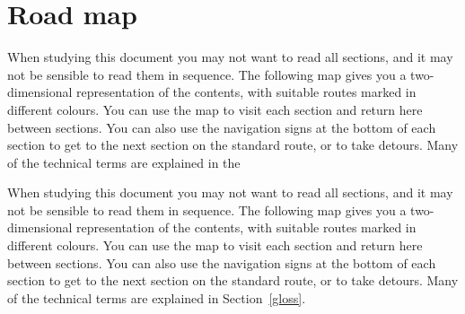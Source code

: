 \begin{htmlonly}
\end{htmlonly}

 \newpage
 \begin{latexonly}
   \setlength{\parskip}{0mm}
   \latexonlytoc
   \setlength{\parskip}{\medskipamount}
   \markright{\stardocname}
 \end{latexonly}
\newpage
\renewcommand{\thepage}{\arabic{page}}
\setcounter{page}{1}


\section{\label{roadmap}Road map}

\begin{htmlonly}
   When studying this document you may not want to read all sections,
   and it may not be sensible to read them in sequence. The following
   map gives you a two-dimensional representation of the contents, with
   suitable routes marked in different colours. You can use the map to
   visit each section and return here between sections. You can
   also use the navigation signs at the bottom of each section to
   get to the next section on the standard route, or to take detours.
   Many of the technical terms are explained in the
\end{htmlonly}
\begin{latexonly}
   When studying this document you may not want to read all sections,
   and it may not be sensible to read them in sequence. The following
   map gives you a two-dimensional representation of the contents, with
   suitable routes marked in different colours. You can use the map to
   visit each section and return here between sections. You can
   also use the navigation signs at the bottom of each section to
   get to the next section on the standard route, or to take detours.
   Many of the technical terms are explained in
Section~\ref{gloss}.
\end{latexonly}

